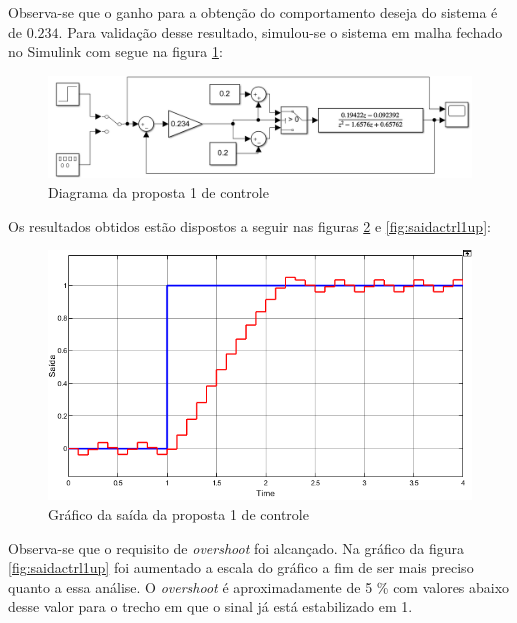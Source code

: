 \documentclass[a4paper,11pt]{article}
\begin{document}
Observa-se que o ganho para a obtenção do comportamento deseja do sistema é de $0.234$. Para validação desse resultado, simulou-se o sistema em malha fechado no Simulink com segue na figura \ref{fig:controle1}:

\begin{figure}[H]
    \centering
    \includegraphics[width=\linewidth]{src/tex/img/controle_1.PNG}
    \caption{Diagrama da proposta 1 de controle}
    \label{fig:controle1}
\end{figure}

Os resultados obtidos estão dispostos a seguir nas figuras \ref{fig:saidactrl1} e \ref{fig:saidactrl1up}: 

\begin{figure}[H]
    \centering
    \includegraphics[width=\linewidth]{src/tex/img/saida_controle_1.png}
    \caption{Gráfico da saída da proposta 1 de controle}
    \label{fig:saidactrl1}
\end{figure}

Observa-se que o requisito de \textit{overshoot} foi alcançado. Na gráfico da figura \ref{fig:saidactrl1up} foi aumentado a escala do gráfico a fim de ser mais preciso quanto a essa análise. O \textit{overshoot} é aproximadamente de 5 \% com valores abaixo desse valor para o trecho em que o sinal já está estabilizado em 1.
\end{document}
